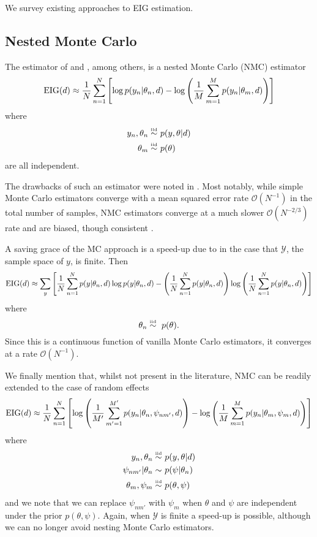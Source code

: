 We survey existing approaches to EIG estimation.

\subsection{Nested Monte Carlo}
\label{sec:nmc}
The estimator of \cite{vincent2017} and \cite{myung2013}, among others, is a nested Monte Carlo (NMC) estimator
\begin{equation}
	\text{EIG}(d) \approx \frac{1}{N}\sum_{n=1}^N \left[ \log p(y_n | \theta_n, d) - \log \left(\frac{1}{M} \sum_{m=1}^M p(y_n | \theta_m, d) \right) \right]
\end{equation}
where
\begin{align}
	y_n, \theta_n \overset{\text{\tiny iid}}{\sim} & \ p(y, \theta | d) \\
	\theta_m \overset{\text{\tiny iid}}{\sim} & \ p(\theta)
\end{align}
are all independent.

The drawbacks of such an estimator were noted in \cite{nmc}. Most notably, while simple Monte Carlo estimators converge with a mean squared error rate $\mathcal{O}(N^{-1})$ in the total number of samples, NMC estimators converge at a much slower $\mathcal{O}(N^{-2/3})$ rate and are biased, though consistent \cite{nmc}.

A saving grace of the MC approach is a speed-up due to \cite{vincent2017} in the case that $\mathcal{Y}$, the sample space of $y$, is finite. Then
\begin{equation}
	\text{EIG}(d) \approx \sum_y \left[ \frac{1}{N}\sum_{n=1}^N p(y | \theta_n, d) \log p(y | \theta_n, d) -  \left(\frac{1}{N} \sum_{n=1}^N p(y | \theta_n, d) \right) \log \left( \frac{1}{N} \sum_{n=1}^N p(y | \theta_n, d) \right) \right]
\end{equation}
where
\begin{equation}
	\theta_n \simiid \ p(\theta).
\end{equation}
Since this is a continuous function of vanilla Monte Carlo estimators, it converges at a rate $\mathcal{O}(N^{-1})$.

We finally mention that, whilst not present in the literature, NMC can be readily extended to the case of random effects
\begin{equation}
	\text{EIG}(d) \approx \frac{1}{N}\sum_{n=1}^N \left[ \log \left(\frac{1}{M'} \sum_{m'=1}^{M'} p(y_n | \theta_n, \psi_{nm'}, d) \right) - \log \left(\frac{1}{M} \sum_{m=1}^M p(y_n | \theta_m, \psi_m, d) \right) \right]
\end{equation}
where
\begin{align}
	y_n, \theta_n \overset{\text{\tiny iid}}{\sim} & \ p(y, \theta | d) \\
	\psi_{nm'} | \theta_n \sim & \ p(\psi | \theta_n) \\
	\theta_m, \psi_m \overset{\text{\tiny iid}}{\sim} & \ p(\theta, \psi)
\end{align}
and we note that we can replace $\psi_{nm'}$ with $\psi_m$ when $\theta$ and $\psi$ are independent under the prior $p(\theta, \psi)$. Again, when $\mathcal{Y}$ is finite a speed-up is possible, although we can no longer avoid nesting Monte Carlo estimators.

